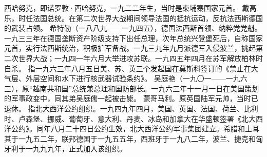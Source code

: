 \begin{maonote}
西哈努克，即诺罗敦·西哈努克，一九二二年生，当时是柬埔寨国家元首。
戴高乐，时任法国总统。在第二次世界大战期间领导法国的抵抗运动，反抗法西斯德国的武装占领。
希特勒（一八八九——一九四五），德国法西斯首领、纳粹党党魁。一九三三年在德国垄断资产阶级支持下出任总理，次年总统兴登堡死后，自称国家元首，实行法西斯统治，积极扩军备战。一九三九年九月派德军入侵波兰，挑起第二次世界大战；一九四一年六月大举进攻苏联。一九四五年四月在苏军解放柏林时自杀。
指一九六三年八月五日美、苏、英三个发起国在莫斯科签订的《禁止在大气层、外层空间和水下进行核武器试验条约》。
吴庭艳（一九〇一——一九六三），原“越南共和国”总统兼总理和国防部长。一九六三年十一月一日在美国策划的军事政变中，同其弟吴庭儒一起被击毙。
蒙哥马利。原英国陆军元帅，当时已退休。
指北大西洋公约组织。一九四九年四月，美国、英国、法国、荷兰、比利时、卢森堡、挪威、葡萄牙、意大利、丹麦、冰岛和加拿大在华盛顿签署《北大西洋公约》。同年八月二十四日公约生效，北大西洋公约军事集团建立。希腊和土耳其于一九五二年，联邦德国于一九五五年，西班牙于一九八二年，波兰、捷克和匈牙利于一九九九年，正式加入该组织。
\end{maonote}
